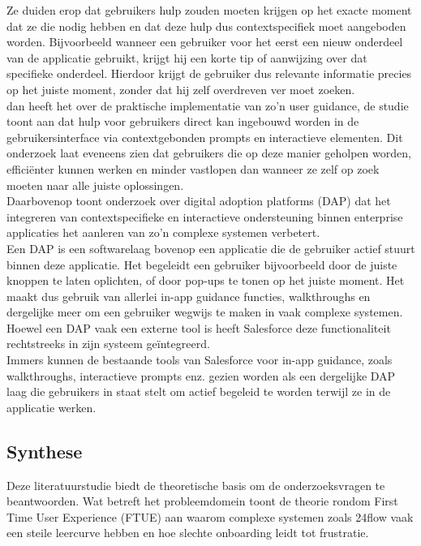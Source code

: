  Ze duiden erop dat gebruikers hulp zouden moeten krijgen op het exacte moment dat ze die nodig hebben en dat deze hulp dus contextspecifiek moet aangeboden worden. Bijvoorbeeld wanneer een gebruiker voor het eerst een nieuw onderdeel van de applicatie gebruikt, krijgt hij een korte tip of aanwijzing over dat specifieke onderdeel. Hierdoor krijgt de gebruiker dus relevante informatie precies op het juiste moment, zonder dat hij zelf overdreven ver moet zoeken.
\\

\textcite{Akiki2019} dan heeft het over de praktische implementatie van zo'n user guidance, de studie toont aan dat hulp voor gebruikers direct kan ingebouwd worden in de gebruikersinterface via contextgebonden prompts en interactieve elementen. Dit onderzoek laat eveneens zien dat gebruikers die op deze manier geholpen worden, efficiënter kunnen werken en minder vastlopen dan wanneer ze zelf op zoek moeten naar alle juiste oplossingen.
\\

Daarbovenop toont onderzoek over digital adoption platforms (DAP) dat het integreren van contextspecifieke en interactieve ondersteuning binnen enterprise applicaties het aanleren van zo'n complexe systemen verbetert.\autocite{Handrich2024}
\\

Een DAP is een softwarelaag bovenop een applicatie die de gebruiker actief stuurt binnen deze applicatie. Het begeleidt een gebruiker bijvoorbeeld door de juiste knoppen te laten oplichten, of door pop-ups te tonen op het juiste moment. Het maakt dus gebruik van allerlei in-app guidance functies, walkthroughs en dergelijke meer om een gebruiker wegwijs te maken in vaak complexe systemen. Hoewel een DAP vaak een externe tool is heeft Salesforce deze functionaliteit rechtstreeks in zijn systeem geïntegreerd.
\\

Immers kunnen de bestaande tools van Salesforce voor in-app guidance, zoals walkthroughs, interactieve prompts enz. gezien worden als een dergelijke DAP laag die gebruikers in staat stelt om actief begeleid te worden terwijl ze in de applicatie werken.

\subsection{Synthese}

Deze literatuurstudie biedt de theoretische basis om de onderzoeksvragen te beantwoorden. Wat betreft het probleemdomein toont de theorie rondom First Time User Experience (FTUE) aan waarom complexe systemen zoals 24flow vaak een steile leercurve hebben en hoe slechte onboarding leidt tot frustratie. 
\\

